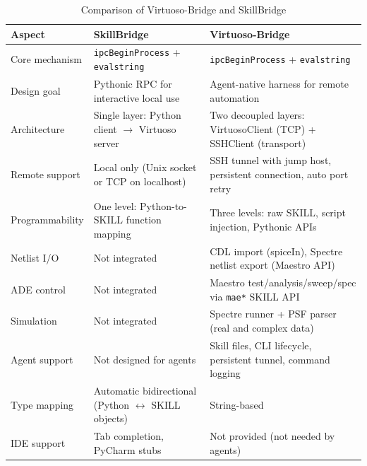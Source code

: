 \begin{table}[!t]
\caption{Comparison of Virtuoso-Bridge and SkillBridge}
\label{tab:comparison_ieee}
\centering
\small
\begin{tabular}{p{}p{}p{}}
\toprule
Aspect & SkillBridge & Virtuoso-Bridge \\
\midrule
Core mechanism & \texttt{ipcBeginProcess} + \texttt{evalstring} & \texttt{ipcBeginProcess} + \texttt{evalstring} \\
Design goal & Pythonic RPC for interactive local use & Agent-native harness for remote automation \\
Architecture & Single layer: Python client $\to$ Virtuoso server & Two decoupled layers: VirtuosoClient (TCP) + SSHClient (transport) \\
Remote support & Local only (Unix socket or TCP on localhost) & SSH tunnel with jump host, persistent connection, auto port retry \\
Programmability & One level: Python-to-SKILL function mapping & Three levels: raw SKILL, script injection, Pythonic APIs \\
Netlist I/O & Not integrated & CDL import (spiceIn), Spectre netlist export (Maestro API) \\
ADE control & Not integrated & Maestro test/analysis/sweep/spec via \texttt{mae*} SKILL API \\
Simulation & Not integrated & Spectre runner + PSF parser (real and complex data) \\
Agent support & Not designed for agents & Skill files, CLI lifecycle, persistent tunnel, command logging \\
Type mapping & Automatic bidirectional (Python $\leftrightarrow$ SKILL objects) & String-based \\
IDE support & Tab completion, PyCharm stubs & Not provided (not needed by agents) \\
\bottomrule
\end{tabular}
\end{table}
